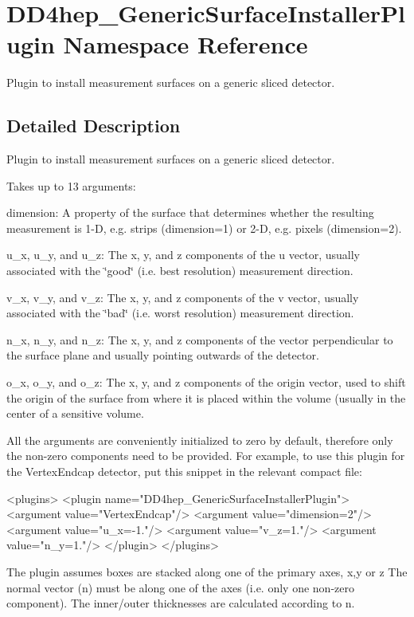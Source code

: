 \hypertarget{namespace_d_d4hep___generic_surface_installer_plugin}{}\section{D\+D4hep\+\_\+\+Generic\+Surface\+Installer\+Plugin Namespace Reference}
\label{namespace_d_d4hep___generic_surface_installer_plugin}


Plugin to install measurement surfaces on a generic sliced detector.  




\subsection{Detailed Description}
Plugin to install measurement surfaces on a generic sliced detector. 

Takes up to 13 arguments\+:
\begin{DoxyItemize}
\item {\ttfamily dimension\+:} A property of the surface that determines whether the resulting measurement is 1-\/D, e.\+g. strips ({\ttfamily dimension=1}) or 2-\/D, e.\+g. pixels ({\ttfamily dimension=2}).
\item {\ttfamily u\+\_\+x}, {\ttfamily u\+\_\+y}, and {\ttfamily u\+\_\+z\+:} The x, y, and z components of the u vector, usually associated with the \char`\"{}good\char`\"{} (i.\+e. best resolution) measurement direction.
\item {\ttfamily v\+\_\+x}, {\ttfamily v\+\_\+y}, and {\ttfamily v\+\_\+z\+:} The x, y, and z components of the v vector, usually associated with the \char`\"{}bad\char`\"{} (i.\+e. worst resolution) measurement direction.
\item {\ttfamily n\+\_\+x}, {\ttfamily n\+\_\+y}, and {\ttfamily n\+\_\+z\+:} The x, y, and z components of the vector perpendicular to the surface plane and usually pointing outwards of the detector.
\item {\ttfamily o\+\_\+x}, {\ttfamily o\+\_\+y}, and {\ttfamily o\+\_\+z\+:} The x, y, and z components of the origin vector, used to shift the origin of the surface from where it is placed within the volume (usually in the center of a sensitive volume.
\end{DoxyItemize}

All the arguments are conveniently initialized to zero by default, therefore only the non-\/zero components need to be provided. For example, to use this plugin for the Vertex\+Endcap detector, put this snippet in the relevant compact file\+: \begin{DoxyVerb}<plugins>
      <plugin name="DD4hep_GenericSurfaceInstallerPlugin">
          <argument value="VertexEndcap"/>
          <argument value="dimension=2"/>
          <argument value="u_x=-1."/>
          <argument value="v_z=1."/>
          <argument value="n_y=1."/>
      </plugin>
</plugins>
\end{DoxyVerb}
 The plugin assumes boxes are stacked along one of the primary axes, x,y or z The normal vector (n) must be along one of the axes (i.\+e. only one non-\/zero component). The inner/outer thicknesses are calculated according to n.

